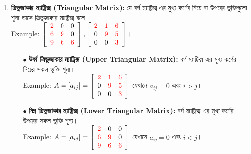 \begin{enumerate}
	\item \textbf{ত্রিভুজাকার ম্যাট্রিক্স (Triangular Matrix):} যে বর্গ ম্যাট্রিক্স এর মুখ্য কর্ণের নিচে বা উপরের ভুক্তিগুলো শূন্য তাকে ত্রিভুজাকার ম্যাট্রিক্স বলে।\\ Example: 
	$
	\left[\begin{array}{ccc}
	\textcolor{red}{2} & 0 & 0 \\
	\textcolor{red}{6} & \textcolor{red}{9} & 0 \\
	\textcolor{red}{9} & \textcolor{red}{6} & \textcolor{red}{6}
	\end{array}\right], 
	\left[\begin{array}{ccc}
	\textcolor{red}{2} & \textcolor{red}{1} & \textcolor{red}{6} \\
	0 & \textcolor{red}{9} & \textcolor{red}{5} \\
	0 & 0 & \textcolor{red}{3}
	\end{array}\right]
	$।
	\begin{tcolorbox}
		\begin{itemize}
			\item[$\bullet$] \textbf{ ঊর্ধ্ব ত্রিভুজাকার ম্যাট্রিক্স (Upper Triangular Matrix):} বর্গ ম্যাট্রিক্স এর মুখ্য কর্ণের নিচের সকল ভুক্তি শূন্য।\\ Example: 
			$A=[a_{ij}]=
			\left[\begin{array}{ccc}
			\textcolor{red}{2} & \textcolor{red}{1} & \textcolor{red}{6} \\
			0 & \textcolor{red}{9} & \textcolor{red}{5} \\
			0 & 0 & \textcolor{red}{3}
			\end{array}\right]$ যেখানে $a_{ij}=0$ এবং $i>j$। 
			\item[$\bullet$] \textbf{ নিম্ন ত্রিভুজাকার ম্যাট্রিক্স (Lower Triangular Matrix):} বর্গ ম্যাট্রিক্স এর মুখ্য কর্ণের উপরের সকল ভুক্তি শূন্য।\\ Example: 
			$A=[a_{ij}]=\left[\begin{array}{ccc}
			\textcolor{red}{2} & 0 & 0 \\
			\textcolor{red}{6} & \textcolor{red}{9} & 0 \\
			\textcolor{red}{9} & \textcolor{red}{6} & \textcolor{red}{6}
			\end{array}\right]$ যেখানে $a_{ij}=0$ এবং $i<j$। 
		\end{itemize}
	\end{tcolorbox}


\end{enumerate}
